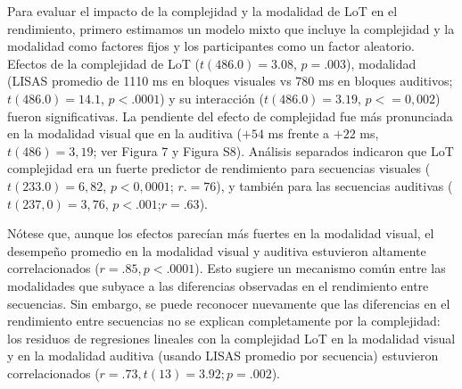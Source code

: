 Para evaluar el impacto de la complejidad y la modalidad de LoT en el rendimiento, primero estimamos un modelo mixto que incluye la complejidad y la modalidad como factores fijos y los participantes como un factor aleatorio. Efectos de la complejidad de LoT ($t (486.0) = 3.08$, $p = .003$), modalidad (LISAS promedio de 1110 ms en bloques visuales vs 780 ms en bloques auditivos; $t (486.0) = 14.1$, $p < .0001$) y su interacción ($t (486.0) = 3.19$, $p< = 0,002$) fueron significativas. La pendiente del efecto de complejidad fue más pronunciada en la modalidad visual que en la auditiva ($+54$ ms frente a $+22$ ms, $t (486) = 3,19$; ver Figura 7 y Figura S8). Análisis separados indicaron que LoT complejidad era un fuerte predictor de rendimiento para secuencias visuales ($t (233.0) = 6,82$, $p <0,0001$; $r. = 76$), y también para las secuencias auditivas ($t (237,0) = 3,76$, $p < . 001$;$ r = .63$).


Nótese que, aunque los efectos parecían más fuertes en la modalidad visual, el desempeño promedio en la modalidad visual y auditiva estuvieron altamente correlacionados ($r = .85, p < .0001$). Esto sugiere un mecanismo común entre las modalidades que subyace a las diferencias observadas en el rendimiento entre secuencias. Sin embargo, se puede reconocer nuevamente que las diferencias en el rendimiento entre secuencias no se explican completamente por la complejidad: los residuos de regresiones lineales con la complejidad LoT en la modalidad visual y en la modalidad auditiva (usando LISAS promedio por secuencia) estuvieron correlacionados ($r = .73, t (13) = 3.92; p = .002$).


